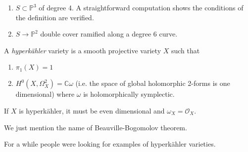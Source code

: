 \begin{example}[K3 surfaces]
\label{example-K3-surfaces}
\begin{enumerate}
\item $S\subset \mathbb{P}^3$ of degree 4. A straightforward computation shows
the conditions of the definition are verified.
\item $S \to \mathbb{P}^2$ double cover ramified along a degree 6 curve.
\end{enumerate}
\end{example}

\begin{definition}
\label{definition-hyperkahler-variety}
A {\it hyperkähler} variety is a smooth projective variety $X$ such that
\begin{enumerate}
\item $\pi_{1}(X)=1$ 
\item $H^{0}(X,\Omega_X^2)=\mathbb{C} \omega$ (i.e. the space of global
holomorphic 2-forms is one dimensional) where $\omega$ is holomorphically
symplectic.
\end{enumerate}
\end{definition}

\begin{remark}
\label{remark-hyperkahler}
If $X$ is hyperkähler, it must be even dimensional and $\omega_X=\mathcal{O}_X$.
\end{remark}

\begin{remark}
\label{remark-Beauville-Bogomolov}
We just mention the name of Beauville-Bogomolov theorem.
\end{remark}

For a while people were looking for examples of hyperkähler varieties.

